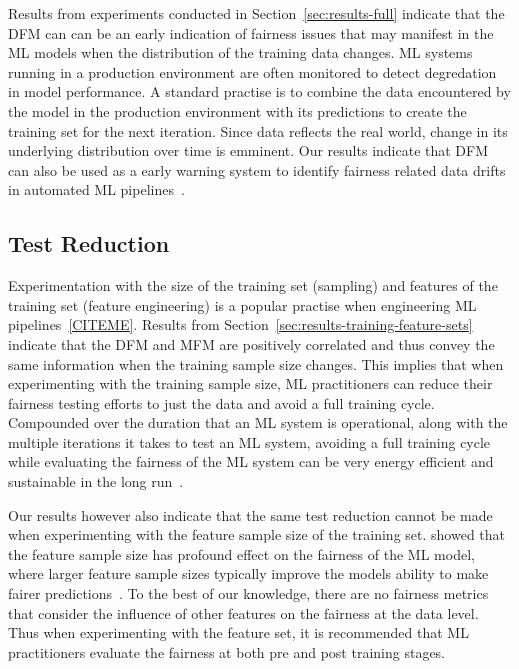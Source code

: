 \documentclass{article}
\begin{document}
Results from experiments conducted in Section \ref{sec:results-full}
indicate that the DFM can can be an early indication of fairness
issues that may manifest in the ML models when the distribution of the
training data changes. ML systems running in a production environment
are often monitored to detect degredation in model performance. A
standard practise is to combine the data encountered by the model in
the production environment with its predictions to create the training
set for the next iteration. Since data reflects the real world, change
in its underlying distribution over time is emminent. Our results
indicate that DFM can also be used as a early warning system to
identify fairness related data drifts in automated ML
pipelines \cite{CITEME}.

\subsection{Test Reduction}\label{sec:discuss-test-red}

Experimentation with the size of the training set (sampling) and
features of the training set (feature engineering) is a popular
practise when engineering ML pipelines \ref{CITEME}. Results from
Section \ref{sec:results-training-feature-sets} indicate that the DFM
and MFM are positively correlated and thus convey the same information
when the training sample size changes. This implies that when
experimenting with the training sample size, ML practitioners can
reduce their fairness testing efforts to just the data and avoid a
full training cycle. Compounded over the duration that an ML system is
operational, along with the multiple iterations it takes to test an ML
system, avoiding a full training cycle while evaluating the fairness
of the ML system can be very energy efficient and sustainable in the
long run \cite{CITME}.


Our results however also indicate that the same test reduction cannot
be made when experimenting with the feature sample size of the
training set. \citeauthor{zhang2021ignorance} showed that the feature
sample size has profound effect on the fairness of the ML model, where
larger feature sample sizes typically improve the models ability to
make fairer predictions \cite{zhang2021ignorance}. To the best of our
knowledge, there are no fairness metrics that consider the influence
of other features on the fairness at the data level. Thus when
experimenting with the feature set, it is recommended that ML
practitioners evaluate the fairness at both pre and post training
stages.
\end{document}
